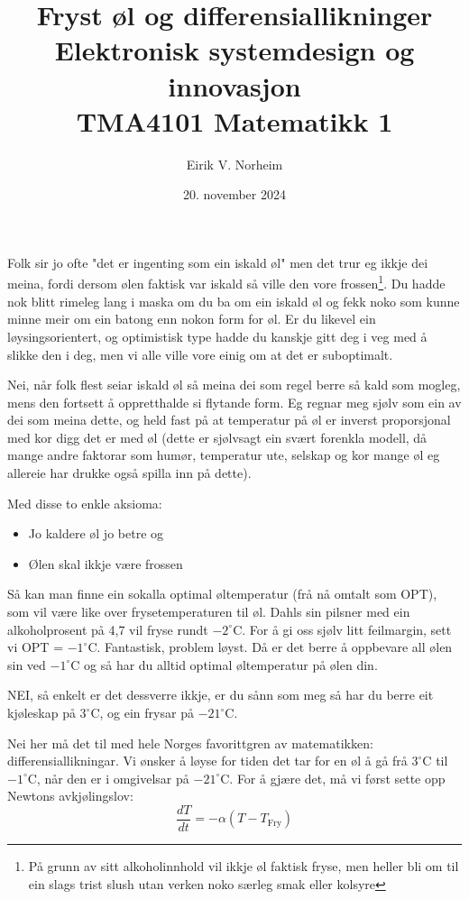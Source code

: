 \documentclass[a4paper,12pt]{article}
\title{\textbf{Fryst øl og differensiallikninger} \\  Elektronisk systemdesign og innovasjon \\ TMA4101 Matematikk 1}
\author{Eirik V. Norheim}
\date{20. november 2024}
\begin{document}
\maketitle

Folk sir jo ofte "det er ingenting som ein iskald øl" men det trur eg ikkje dei meina, fordi dersom ølen faktisk var iskald så ville den vore frossen\footnote{På grunn av sitt alkoholinnhold vil ikkje øl faktisk fryse, men heller bli om til ein slags trist slush utan verken noko særleg smak eller kolsyre}. Du hadde nok blitt rimeleg lang i maska om du ba om ein iskald øl og fekk noko som kunne minne meir om ein batong enn nokon form for øl. Er du likevel ein løysingsorientert, og optimistisk type hadde du kanskje gitt deg i veg med å slikke den i deg, men vi alle ville vore einig om at det er suboptimalt.

Nei, når folk flest seiar iskald øl så meina dei som regel berre så kald som mogleg, mens den fortsett å oppretthalde si flytande form. Eg regnar meg sjølv som ein av dei som meina dette, og held fast på at temperatur på øl er inverst proporsjonal med kor digg det er med øl (dette er sjølvsagt ein svært forenkla modell, då mange andre faktorar som humør, temperatur ute, selskap og kor mange øl eg allereie har drukke også spilla inn på dette).

Med disse to enkle aksioma:
\begin{itemize}
    \item Jo kaldere øl jo betre og
    \item Ølen skal ikkje være frossen
\end{itemize}

\vspace{0.5cm}

Så kan man finne ein sokalla optimal øltemperatur (frå nå omtalt som OPT), som vil være like over frysetemperaturen til øl. Dahls sin pilsner med ein alkoholprosent på 4,7 vil fryse rundt $-2^\circ$C. For å gi oss sjølv litt feilmargin, sett vi OPT = $-1^\circ$C. Fantastisk, problem løyst. Då er det berre å oppbevare all ølen sin ved $-1^\circ$C og så har du alltid optimal øltemperatur på ølen din.

NEI, så enkelt er det dessverre ikkje, er du sånn som meg så har du berre eit kjøleskap på $3^\circ$C, og ein frysar på $-21^\circ$C.

Nei her må det til med hele Norges favorittgren av matematikken: differensiallikningar. Vi ønsker å løyse for tiden det tar for en øl å gå frå $3^\circ$C til $-1^\circ$C, når den er i omgivelsar på $-21^\circ$C. For å gjære det, må vi først sette opp Newtons avkjølingslov:
\[
\frac{dT}{dt} = -\alpha (T - T_\text{Fry})
\]
\end{document}
